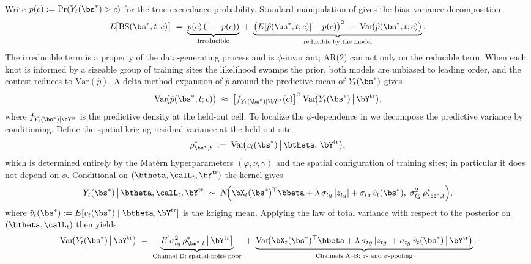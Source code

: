 Write $p(c) := \mathrm{Pr}(Y_t(\bs^*) > c)$ for the true exceedance probability.  Standard manipulation of  gives the bias--variance decomposition
\begin{align}
  E\!\big[\mathrm{BS}(\bs^*, t; c)\big]
    \;=\; \underbrace{p(c)\,(1 - p(c))}_{\text{irreducible}}
       \;+\; \underbrace{\big(E[\hat p(\bs^*, t; c)] - p(c)\big)^2 \;+\; \mathrm{Var}\!\big(\hat p(\bs^*, t; c)\big)}_{\text{reducible by the model}}.
  \label{eq:brier-split-disc}
\end{align}
The irreducible term is a property of the data-generating process and is $\phi$-invariant; AR(2) can act only on the reducible term.  When each knot is informed by a sizeable group of training sites the likelihood swamps the prior, both models are unbiased to leading order, and the contest reduces to $\mathrm{Var}(\hat p)$.  A delta-method expansion of $\hat p$ around the predictive mean of $Y_t(\bs^*)$ gives
\begin{align}
  \mathrm{Var}\!\big(\hat p(\bs^*, t; c)\big)
    \;\approx\; \big[f_{Y_t(\bs^*) \mid \bY^{\mathrm{tr}}}(c)\big]^2 \;
                \mathrm{Var}\!\big(Y_t(\bs^*) \,\big|\, \bY^{\mathrm{tr}}\big),
  \label{eq:delta-method}
\end{align}
where $f_{Y_t(\bs^*) \mid \bY^{\mathrm{tr}}}$ is the predictive density at the held-out cell.  To localize the $\phi$-dependence in  we decompose the predictive variance by conditioning.  Define the spatial kriging-residual variance at the held-out site
\begin{align}
  \rho^*_{\bs^*, t} \;:=\; \mathrm{Var}\!\big(v_t(\bs^*) \,\big|\, \btheta,\, \bY^{\mathrm{tr}}\big),
  \label{eq:kriging-resid}
\end{align}
which is determined entirely by the Mat\'ern hyperparameters $(\varphi, \nu, \gamma)$ and the spatial configuration of training sites; in particular it does not depend on $\phi$.  Conditional on $(\btheta, \calL_t, \bY^{\mathrm{tr}})$ the kernel  gives
\begin{align}
  Y_t(\bs^*) \,\big|\, \btheta, \calL_t, \bY^{\mathrm{tr}}
   \;\sim\; N\!\Big(\bX_t(\bs^*)^\top\bbeta + \lambda\,\sigma_{tg}\,|z_{tg}| + \sigma_{tg}\,\hat v_t(\bs^*),\;
                    \sigma^2_{tg}\,\rho^*_{\bs^*, t}\Big),
  \label{eq:cond-pred}
\end{align}
where $\hat v_t(\bs^*) := E[v_t(\bs^*) \mid \btheta, \bY^{\mathrm{tr}}]$ is the kriging mean.  Applying the law of total variance with respect to the posterior on $(\btheta, \calL_t)$ then yields
\begin{align}
  \mathrm{Var}\!\big(Y_t(\bs^*) \,\big|\, \bY^{\mathrm{tr}}\big)
    \;=\; \underbrace{E\!\big[\sigma^2_{tg}\,\rho^*_{\bs^*, t} \,\big|\, \bY^{\mathrm{tr}}\big]}_{\text{Channel D: spatial-noise floor}}
    \;+\; \underbrace{\mathrm{Var}\!\big(\bX_t(\bs^*)^\top\bbeta + \lambda\,\sigma_{tg}\,|z_{tg}| + \sigma_{tg}\,\hat v_t(\bs^*) \,\big|\, \bY^{\mathrm{tr}}\big)}_{\text{Channels A--B: }z\text{- and }\sigma\text{-pooling}}.
  \label{eq:var-decomp-disc}
\end{align}

